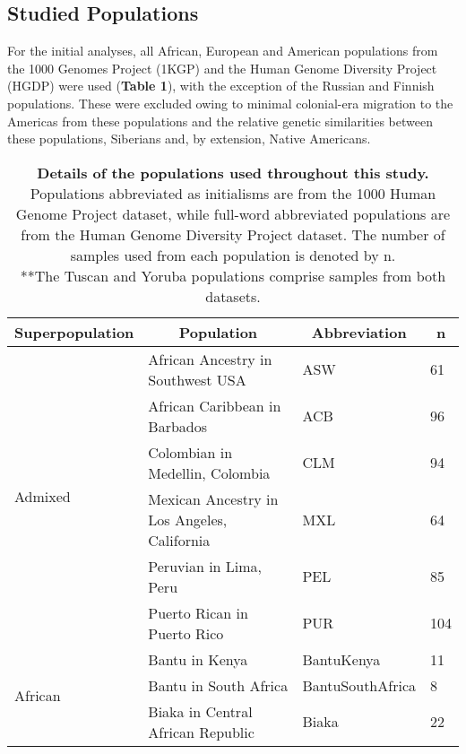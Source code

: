 \documentclass[11pt]{article}
\begin{document}
\subsection{Studied Populations}


For the initial analyses, all African, European and American populations from the 1000 Genomes Project (1KGP) and the Human Genome Diversity Project (HGDP) were used (\textbf{Table 1}), with the exception of the Russian and Finnish populations. These were excluded owing to minimal colonial-era migration to the Americas from these populations and the relative genetic similarities between these populations, Siberians and, by extension, Native Americans.


\begin{table}[htb]
    \centering
    \caption{
        \textbf{Details of the populations used throughout this study.} 
        Populations abbreviated as initialisms are from the 1000 Human Genome Project dataset, while full-word abbreviated populations are from the Human Genome Diversity Project dataset. The number of samples used from each population is denoted by n. \\
        **The Tuscan and Yoruba populations comprise samples from both datasets.
        }
    \vspace{.2cm}
    \small
    \begin{tabular}{ |p{3cm}||p{8cm}|p{3cm}|p{0.8cm}|  }
    \hline
    \multicolumn{1}{|c||}{\textbf{Superpopulation}} &
    \multicolumn{1}{c|}{\textbf{Population}} & 
    \multicolumn{1}{c|}{\textbf{Abbreviation}} & %
    \multicolumn{1}{c|}{\textbf{n}}\\
    \hline
    \hline
    \multirow{6}{*}{Admixed}  %
        &African Ancestry in Southwest USA & ASW & 61 \\
        &African Caribbean in Barbados & ACB & 96 \\
        &Colombian in Medellin, Colombia & CLM & 94 \\
        &Mexican Ancestry in Los Angeles, California & MXL & 64 \\
        &Peruvian in Lima, Peru & PEL & 85 \\
        &Puerto Rican in Puerto Rico & PUR & 104 \\
        \hline
    \multirow{11}{*}{African}
        &Bantu in Kenya & BantuKenya & 11 \\
        &Bantu in South Africa & BantuSouthAfrica & 8 \\
        &Biaka in Central African Republic & Biaka & 22 \\

\end{tabular}
\end{table}
\end{document}
